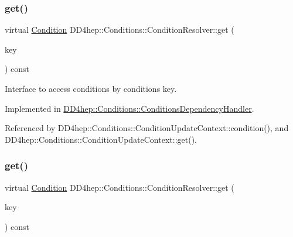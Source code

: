 \subsubsection{\texorpdfstring{get()}{get()}\hspace{0.1cm}{\footnotesize\ttfamily [1/2]}}
{\footnotesize\ttfamily virtual \hyperlink{class_d_d4hep_1_1_conditions_1_1_condition}{Condition} D\+D4hep\+::\+Conditions\+::\+Condition\+Resolver\+::get (\begin{DoxyParamCaption}\item[{const \hyperlink{class_d_d4hep_1_1_conditions_1_1_condition_key}{Condition\+Key} \&}]{key }\end{DoxyParamCaption}) const\hspace{0.3cm}{\ttfamily [pure virtual]}}



Interface to access conditions by conditions key. 



Implemented in \hyperlink{class_d_d4hep_1_1_conditions_1_1_conditions_dependency_handler_aad2210814936ed6c04fe86b760cfb402}{D\+D4hep\+::\+Conditions\+::\+Conditions\+Dependency\+Handler}.



Referenced by D\+D4hep\+::\+Conditions\+::\+Condition\+Update\+Context\+::condition(), and D\+D4hep\+::\+Conditions\+::\+Condition\+Update\+Context\+::get().

\hypertarget{class_d_d4hep_1_1_conditions_1_1_condition_resolver_ac321d32bbe1d5e777859c2490c68b571}{}\label{class_d_d4hep_1_1_conditions_1_1_condition_resolver_ac321d32bbe1d5e777859c2490c68b571} 
\subsubsection{\texorpdfstring{get()}{get()}\hspace{0.1cm}{\footnotesize\ttfamily [2/2]}}
{\footnotesize\ttfamily virtual \hyperlink{class_d_d4hep_1_1_conditions_1_1_condition}{Condition} D\+D4hep\+::\+Conditions\+::\+Condition\+Resolver\+::get (\begin{DoxyParamCaption}\item[{unsigned int}]{key }\end{DoxyParamCaption}) const\hspace{0.3cm}{\ttfamily [pure virtual]}}



